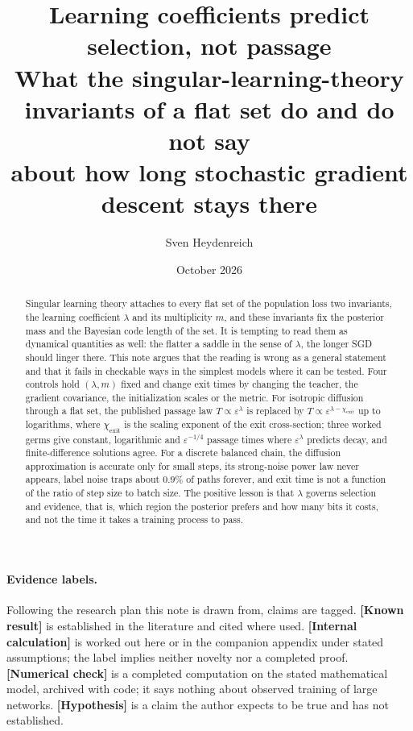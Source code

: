 \documentclass[11pt,a4paper]{article}
\title{\textbf{Learning coefficients predict selection, not passage}\\[0.4em]
\large What the singular-learning-theory invariants of a flat set do and do not say\\
about how long stochastic gradient descent stays there}
\author{Sven Heydenreich}
\date{October 2026}
\newcommand{\eps}{\varepsilon}
\newcommand{\chiexit}{\chi_{\mathrm{exit}}}
\newcommand{\evl}[2]{{\small\bfseries\color{#1}[#2]}}
\newcommand{\LKnown}{\evl{cknown}{Known result}}
\newcommand{\LCalc}{\evl{ccalc}{Internal calculation}}
\newcommand{\LNum}{\evl{cnum}{Numerical check}}
\newcommand{\LHyp}{\evl{chyp}{Hypothesis}}
\begin{document}
\maketitle

\begin{abstract}
\noindent
Singular learning theory attaches to every flat set of the population loss
two invariants, the learning coefficient $\lambda$ and its multiplicity $m$,
and these invariants fix the posterior mass and the Bayesian code length of
the set. It is tempting to read them as dynamical quantities as well: the
flatter a saddle in the sense of $\lambda$, the longer SGD should linger
there. This note argues that the reading is wrong as a general statement and
that it fails in checkable ways in the simplest models where it can be
tested. Four controls hold $(\lambda,m)$ fixed and change exit times by
changing the teacher, the gradient covariance, the initialization scales or
the metric. For isotropic diffusion through a flat set, the published
passage law $T\propto\eps^\lambda$ is replaced by
$T\propto\eps^{\lambda-\chiexit}$ up to logarithms, where $\chiexit$ is the
scaling exponent of the exit cross-section; three worked germs give
constant, logarithmic and $\eps^{-1/4}$ passage times where $\eps^\lambda$
predicts decay, and finite-difference solutions agree. For a discrete
balanced chain, the diffusion approximation is accurate only for small
steps, its strong-noise power law never appears, label noise traps about
$0.9\%$ of paths forever, and exit time is not a function of the ratio of
step size to batch size. The positive lesson is that $\lambda$ governs
selection and evidence, that is, which region the posterior prefers and how
many bits it costs, and not the time it takes a training process to pass.
\end{abstract}

\paragraph{Evidence labels.} Following the research plan this note is drawn
from, claims are tagged. \LKnown{} is established in the literature and
cited where used. \LCalc{} is worked out here or in the companion appendix
under stated assumptions; the label implies neither novelty nor a completed
proof. \LNum{} is a completed computation on the stated mathematical model,
archived with code; it says nothing about observed training of large
networks. \LHyp{} is a claim the author expects to be true and has not
established.
\end{document}
